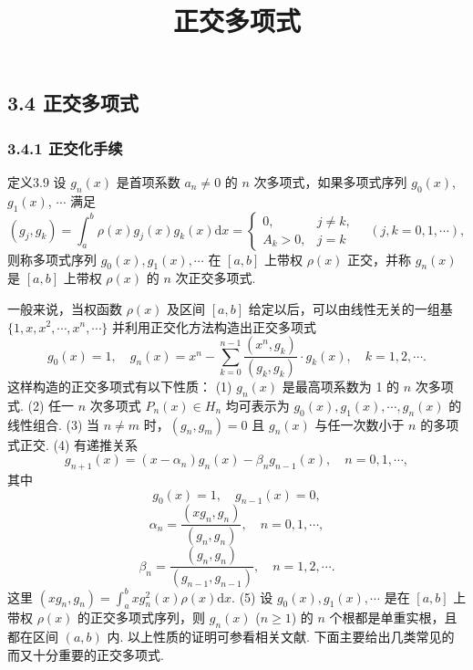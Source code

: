 \documentclass[
  10pt,
  fontset=fandol]{ctexart}
\title{正交多项式}
\author{}
\date{}
\begin{document}
\maketitle

\subsection{3.4 正交多项式}\label{ux6b63ux4ea4ux591aux9879ux5f0f}

\subsubsection{3.4.1 正交化手续}\label{ux6b63ux4ea4ux5316ux624bux7eed}

定义3.9 设 \(g_n(x)\) 是首项系数 \(a_n \neq 0\) 的 \(n\) 次多项式，如果多项式序列 \(g_0(x)\), \(g_1(x)\), \(\cdots\) 满足 \[
(g_j, g_k) = \int_a^b \rho(x) g_j(x) g_k(x) \mathrm{d}x = \begin{cases} 0, & j \neq k, \\ A_k > 0, & j = k \end{cases} \quad (j, k = 0, 1, \cdots),
\] 则称多项式序列 \(g_0(x), g_1(x), \cdots\) 在 \([a, b]\) 上带权 \(\rho(x)\) 正交，并称 \(g_n(x)\) 是 \([a, b]\) 上带权 \(\rho(x)\) 的 \(n\) 次正交多项式.

一般来说，当权函数 \(\rho(x)\) 及区间 \([a, b]\) 给定以后，可以由线性无关的一组基 \(\{1,\allowbreak  x,\allowbreak  x^2,\allowbreak  \cdots,\allowbreak  x^n,\allowbreak  \cdots\}\) 并利用正交化方法构造出正交多项式 \[
g_0(x) = 1, \quad g_n(x) = x^n - \sum_{k=0}^{n-1} \frac{(x^n, g_k)}{(g_k, g_k)} \cdot g_k(x), \quad k = 1, 2, \cdots.
\] 这样构造的正交多项式有以下性质： (1) \(g_n(x)\) 是最高项系数为 1 的 \(n\) 次多项式. (2) 任一 \(n\) 次多项式 \(P_n(x) \in H_n\) 均可表示为 \(g_0(x), g_1(x), \cdots, g_n(x)\) 的线性组合. (3) 当 \(n \neq m\) 时，\((g_n, g_m) = 0\) 且 \(g_n(x)\) 与任一次数小于 \(n\) 的多项式正交. (4) 有递推关系 \[
g_{n+1}(x) = (x - \alpha_n)g_n(x) - \beta_n g_{n-1}(x), \quad n = 0, 1, \cdots,
\] 其中 \[
g_0(x) = 1, \quad g_{n-1}(x) = 0,
\] \[
\alpha_n = \frac{(xg_n, g_n)}{(g_n, g_n)}, \quad n = 0, 1, \cdots,
\] \[
\beta_n = \frac{(g_n, g_n)}{(g_{n-1}, g_{n-1})}, \quad n = 1, 2, \cdots.
\] 这里 \((xg_n, g_n) = \int_a^b xg_n^2(x) \rho(x) \mathrm{d}x.\) (5) 设 \(g_0(x), g_1(x), \cdots\) 是在 \([a, b]\) 上带权 \(\rho(x)\) 的正交多项式序列，则 \(g_n(x)\) (\(n \geq 1\)) 的 \(n\) 个根都是单重实根，且都在区间 \((a, b)\) 内. 以上性质的证明可参看相关文献. 下面主要给出几类常见的而又十分重要的正交多项式.
\end{document}
